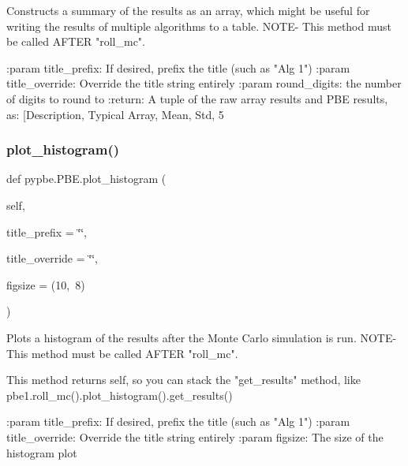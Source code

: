 \begin{DoxyVerb}Constructs a summary of the results as an array, which might be
useful for writing the results of multiple algorithms to a table.
NOTE- This method must be called AFTER "roll_mc".

:param title_prefix: If desired, prefix the title (such as "Alg 1")
:param title_override: Override the title string entirely
:param round_digits: the number of digits to round to
:return: A tuple of the raw array results and PBE results, as:
 [Description, Typical Array, Mean, Std, 5%
\end{DoxyVerb}
 \mbox{\label{classpypbe_1_1_p_b_e_a84bc2f7406dfee08c190e47d0c719554}} 
\subsubsection{\texorpdfstring{plot\+\_\+histogram()}{plot\_histogram()}}
{\footnotesize\ttfamily def pypbe.\+P\+B\+E.\+plot\+\_\+histogram (\begin{DoxyParamCaption}\item[{}]{self,  }\item[{}]{title\+\_\+prefix = {\ttfamily \char`\"{}\char`\"{}},  }\item[{}]{title\+\_\+override = {\ttfamily \char`\"{}\char`\"{}},  }\item[{}]{figsize = {\ttfamily (10,~8)} }\end{DoxyParamCaption})}

\begin{DoxyVerb}Plots a histogram of the results after the Monte Carlo simulation is
run. NOTE- This method must be called AFTER "roll_mc".

This method returns self, so you can stack the "get_results" method,
like pbe1.roll_mc().plot_histogram().get_results()

:param title_prefix: If desired, prefix the title (such as "Alg 1")
:param title_override: Override the title string entirely
:param figsize: The size of the histogram plot
\end{DoxyVerb}
 \mbox{\label{classpypbe_1_1_p_b_e_aff58246daa59e87f0261afc04a43f98e}} 
